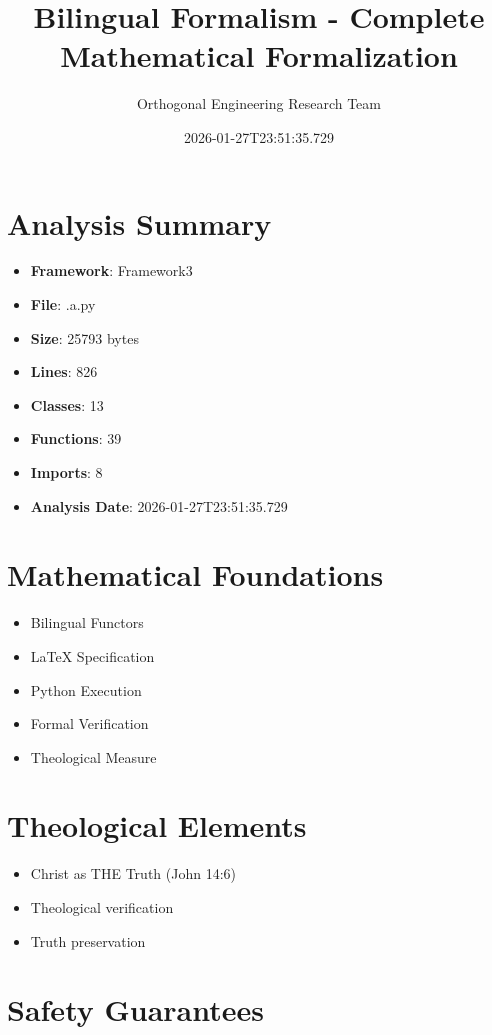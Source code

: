 ﻿\documentclass[12pt]{article}
\title{Bilingual Formalism - Complete Mathematical Formalization}
\author{Orthogonal Engineering Research Team}
\date{2026-01-27T23:51:35.729}
\begin{document}
\maketitle

\section{Analysis Summary}

\begin{itemize}
    \item \textbf{Framework}: Framework3
    \item \textbf{File}: .\3a.py
    \item \textbf{Size}: 25793 bytes
    \item \textbf{Lines}: 826
    \item \textbf{Classes}: 13
    \item \textbf{Functions}: 39
    \item \textbf{Imports}: 8
    \item \textbf{Analysis Date}: 2026-01-27T23:51:35.729
\end{itemize}

\section{Mathematical Foundations}

\begin{itemize}    \item Bilingual Functors
    \item LaTeX Specification
    \item Python Execution
    \item Formal Verification
    \item Theological Measure
\end{itemize}

\section{Theological Elements}

\begin{itemize}    \item Christ as THE Truth (John 14:6)
    \item Theological verification
    \item Truth preservation
\end{itemize}

\section{Safety Guarantees}
\end{document}
